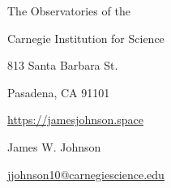 \documentclass[cv.tex]{subfiles}
\begin{document}
\begin{center}
\parbox{.38\textwidth}{%
	\raggedleft%
	\vspace{-1.5cm}%
	The Observatories of the \par
	Carnegie Institution for Science \par
	813 Santa Barbara St. \par
	Pasadena, CA 91101 \par
	\url{https://jamesjohnson.space}%
}%
\hspace{4mm}%
\vrule height 2.0cm width 0.4pt%
\hspace{4mm}%
\parbox{.56\textwidth}{%
	{%
	\vspace{-1.5cm}%
	\fontsize{30}{36} \selectfont James W. Johnson \par
	\fontsize{20}{25} \selectfont {} \par
	\fontsize{11}{13} \selectfont%
	\vspace{0.08cm}%
	\href{mailto:jjohnson10@carnegiescience.edu}{jjohnson10@carnegiescience.edu}%
	\hspace{3mm}%
	}%
}%
\end{center}
\end{document}
